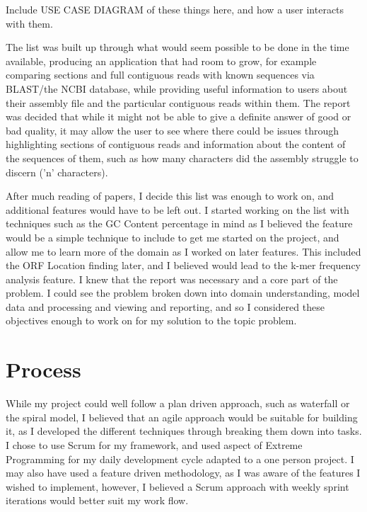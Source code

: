 Include USE CASE DIAGRAM of these things here, and how a user interacts with them.

The list was built up through what would seem possible to be done in the time available, producing an application that had room to grow, for example comparing sections and full contiguous reads with known sequences via BLAST/the NCBI database, while providing useful information to users about their assembly file and the particular contiguous reads within them. The report was decided that while it might not be able to give a definite answer of good or bad quality, it may allow the user to see where there could be issues through highlighting sections of contiguous reads and information about the content of the sequences of them, such as how many characters did the assembly struggle to discern ('n' characters).

After much reading of papers, I decide this list was enough to work on, and additional features would have to be left out. I started working on the list with techniques such as the GC Content percentage in mind as I believed the feature would be a simple technique to include to get me started on the project, and allow me to learn more of the domain as I worked on later features. This included the ORF Location finding later, and I believed would lead to the k-mer frequency analysis feature. I knew that the report was necessary and a core part of the problem. I could see the problem broken down into domain understanding, model data and processing and viewing and reporting, and so I considered these objectives enough to work on for my solution to the topic problem.




\section{Process}
While my project could well follow a plan driven approach, such as waterfall or the spiral model, I believed that an agile approach would be suitable for building it, as I developed the different techniques through breaking them down into tasks. I chose to use Scrum for my framework, and used aspect of Extreme Programming for my daily development cycle adapted to a one person project. I may also have used a feature driven methodology, as I was aware of the features I wished to implement, however, I believed a Scrum approach with weekly sprint iterations would better suit my work flow.

